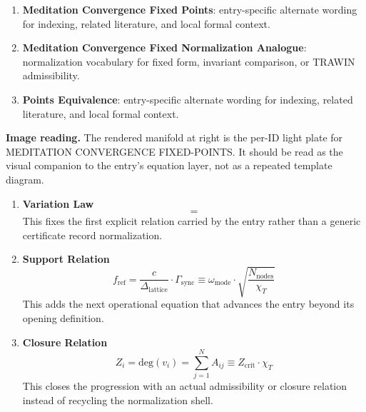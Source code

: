 \begin{enumerate}[leftmargin=1.6em,itemsep=6pt,topsep=4pt]
\item \textbf{Meditation Convergence Fixed Points}: entry-specific alternate wording for indexing, related literature, and local formal context.
\item \textbf{Meditation Convergence Fixed Normalization Analogue}: normalization vocabulary for fixed form, invariant comparison, or TRAWIN admissibility.
\item \textbf{Points Equivalence}: entry-specific alternate wording for indexing, related literature, and local formal context.
\end{enumerate}

\begin{samepage}
\noindent\begin{minipage}[t]{0.45\linewidth}
\vspace{0pt}
\raggedright
\scriptsize\textbf{Image reading.} The rendered manifold at right is the per-ID light plate for MEDITATION CONVERGENCE FIXED-POINTS. It should be read as the visual companion to the entry's equation layer, not as a repeated template diagram.\par
\end{minipage}\hfill
\begin{minipage}[t]{0.53\linewidth}
\vspace*{-0.10in}
\raggedright
{}
\end{minipage}
\end{samepage}

\clearpage


\begin{enumerate}[leftmargin=1.6em,itemsep=9pt,topsep=6pt]
\item \textbf{Variation Law}
\[
=
\]
This fixes the first explicit relation carried by the entry rather than a generic certificate record normalization.

\item \textbf{Support Relation}
\[
f_{\text{ref}} = \frac{c}{\Delta_{\text{lattice}}} \cdot \Gamma_{\text{sync}} \equiv \omega_{\text{mode}} \cdot \sqrt{\frac{N_{\text{nodes}}}{\chi_T}}
\]
This adds the next operational equation that advances the entry beyond its opening definition.

\item \textbf{Closure Relation}
\[
Z_i = \text{deg}(v_i) = \sum_{j=1}^{N} A_{ij} \equiv Z_{\text{crit}} \cdot \chi_T
\]
This closes the progression with an actual admissibility or closure relation instead of recycling the normalization shell.
\end{enumerate}

